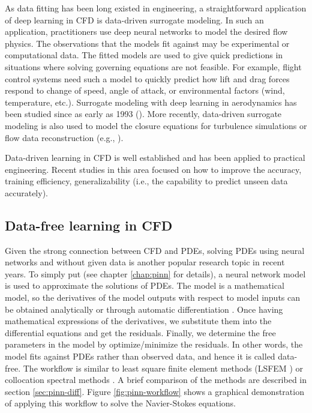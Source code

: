 As data fitting has been long existed in engineering, a straightforward application of deep learning in CFD is data-driven surrogate modeling.
In such an application, practitioners use deep neural networks to model the desired flow physics.
The observations that the models fit against may be experimental or computational data.
The fitted models are used to give quick predictions in situations where solving governing equations are not feasible.
For example, flight control systems need such a model to quickly predict how lift and drag forces respond to change of speed, angle of attack, or environmental factors (wind, temperature, etc.). 
Surrogate modeling with deep learning in aerodynamics has been studied since as early as 1993 (\cite{linse_identification_1993, faller_unsteady_1997}).
More recently, data-driven surrogate modeling is also used to model the closure equations for turbulence simulations or flow data reconstruction (e.g., \cite{Tracey2015,milano_neural_2002}).

Data-driven learning in CFD is well established and has been applied to practical engineering.
Recent studies in this area focused on how to improve the accuracy, training efficiency, generalizability (i.e., the capability to predict unseen data accurately).

\subsection*{Data-free learning in CFD}

Given the strong connection between CFD and PDEs, solving PDEs using neural networks and without given data is another popular research topic in recent years.
To simply put (see chapter \ref{chap:pinn} for details), a neural network model is used to approximate the solutions of PDEs.
The model is a mathematical model, so the derivatives of the model outputs with respect to model inputs can be obtained analytically or through automatic differentiation \cite{griewank_automatic_1988}.
Once having mathematical expressions of the derivatives, we substitute them into the differential equations and get the residuals. 
Finally, we determine the free parameters in the model by optimize/minimize the residuals.
In other words, the model fits against PDEs rather than observed data, and hence it is called data-free.
The workflow is similar to least square finite element methods (LSFEM \cite{jiang_least-squares_1998}) or collocation spectral methods \cite{trefethen_spectral_2000}.
A brief comparison of the methods are described in section \ref{sec:pinn-diff}.
Figure \ref{fig:pinn-workflow} shows a graphical demonstration of applying this workflow to solve the Navier-Stokes equations. 

